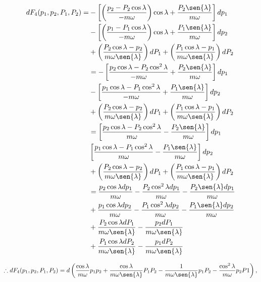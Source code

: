 \documentclass[a4paper,10pt]{article}
\numberwithin{equation}{section}
\begin{document}
\begin{align}
 \begin{split}
 dF_4(p_1,p_2,P_1,P_2) = &- \left[ \left( \frac{p_2 - P_2\cos{\lambda}}{-m\omega}\right)\cos{\lambda} 
 + \frac{P_2\sen{\lambda}}{m\omega}\right]dp_1 \\
 &- \left[ \left(\frac{p_1 - P_1\cos{\lambda}}{-m\omega}\right)\cos{\lambda} 
 + \frac{P_1\sen{\lambda}}{m\omega}\right]dp_2 \\
 &+ \left(\frac{P_2\cos{\lambda} - p_2}{m\omega\sen{\lambda}} \right)dP_1 
 + \left(\frac{P_1\cos{\lambda} - p_1}{m\omega\sen{\lambda}} \right)dP_2 \\
 &= - \left[\frac{p_2\cos{\lambda} - P_2\cos^2{\lambda}}{-m\omega} 
 + \frac{P_2\sen{\lambda}}{m\omega}\right]dp_1 \\
 &- \left[\frac{p_1\cos{\lambda}  - P_1\cos^2{\lambda}}{-m\omega}
 + \frac{P_1\sen{\lambda}}{m\omega}\right]dp_2 \\
 &+ \left(\frac{P_2\cos{\lambda} - p_2}{m\omega\sen{\lambda}} \right)dP_1 
 + \left(\frac{P_1\cos{\lambda} - p_1}{m\omega\sen{\lambda}} \right)dP_2 \\
 &= \left[\frac{p_2\cos{\lambda} - P_2\cos^2{\lambda}}{m\omega} 
 - \frac{P_2\sen{\lambda}}{m\omega}\right]dp_1 \\
 & \left[\frac{p_1\cos{\lambda}  - P_1\cos^2{\lambda}}{m\omega}
 - \frac{P_1\sen{\lambda}}{m\omega}\right]dp_2 \\
 &+ \left(\frac{P_2\cos{\lambda} - p_2}{m\omega\sen{\lambda}} \right)dP_1 
 + \left(\frac{P_1\cos{\lambda} - p_1}{m\omega\sen{\lambda}} \right)dP_2 \\
 &= \frac{p_2\cos{\lambda}dp_1}{m\omega} - \frac{P_2\cos^2{\lambda}dp_1}{m\omega}
 - \frac{P_2\sen{\lambda}dp_1}{m\omega} \\
 &+ \frac{p_1\cos{\lambda}dp_2}{m\omega} - \frac{P_1\cos^2{\lambda}dp_2}{m\omega}
 - \frac{P_1\sen{\lambda}dp_2}{m\omega} \\
 &+ \frac{P_2\cos{\lambda}dP_1}{m\omega\sen{\lambda}} - 
 \frac{p_2dP_1}{m\omega\sen{\lambda}} \\
 &+ \frac{P_1\cos{\lambda}dP_2}{m\omega\sen{\lambda}} - 
 \frac{p_1dP_2}{m\omega\sen{\lambda}}
 \end{split}
\end{align}

\begin{equation*}
 \therefore dF_4(p_1,p_2,P_1,P_2) = d\left(\frac{\cos{\lambda}}{m\omega}p_1p_2 + 
 \frac{\cos{\lambda}}{m\omega\sen{\lambda}}P_1P_2 -
 \frac{1}{m\omega\sen{\lambda}}p_1P_2 - \frac{\cos^2{\lambda}}{m\omega}p_2P1 \right),
\end{equation*}
\end{document}
